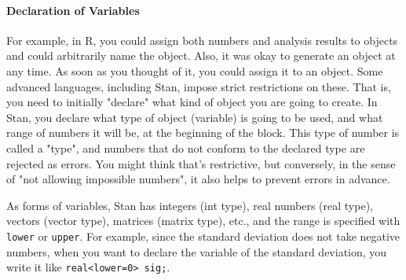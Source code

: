 \documentclass{ltjsbook}
\begin{document}
\paragraph{Declaration of Variables}
For example, in R, you could assign both numbers and analysis results to objects and could arbitrarily name the object. Also, it was okay to generate an object at any time. As soon as you thought of it, you could assign it to an object.
Some advanced languages, including Stan, impose strict restrictions on these. That is, you need to initially "declare" what kind of object you are going to create. In Stan, you declare what type of object (variable) is going to be used, and what range of numbers it will be, at the beginning of the block. This type of number is called a "type", and numbers that do not conform to the declared type are rejected as errors. You might think that's restrictive, but conversely, in the sense of "not allowing impossible numbers", it also helps to prevent errors in advance.

As forms of variables, Stan has integers (int type), real numbers (real type), vectors (vector type), matrices (matrix type), etc., and the range is specified with \texttt{lower} or \texttt{upper}. For example, since the standard deviation does not take negative numbers, when you want to declare the variable of the standard deviation, you write it like \verb|real<lower=0> sig;|.
\end{document}
